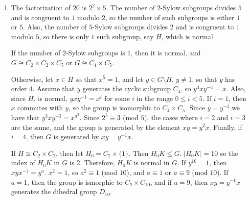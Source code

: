 \documentclass[a4paper,12pt]{article}
\begin{document}
\begin{enumerate}
\begin{enumerate}
            \item
                The factorization of $20$ is $2^2 \times 5$. The number of $2$-Sylow subgroups divides $5$ and is congruent to $1$ modulo $2$, so the number of such subgroups is either $1$ or $5$. Also, the number of $5$-Sylow subgroups divides $2$ and is congruent to $1$ modulo $5$, so there is only $1$ such subgroup, say $H$, which is normal. \par
                If the number of $2$-Sylow subgroups is $1$, then it is normal, and $G \cong C_2 \times C_2 \times C_5$ or $G \cong C_4 \times C_5$. \par
                Otherwise, let $x \in H$ so that $x^5 = 1$, and let $y \in G \setminus H$, $y \neq 1$, so that $y$ has order $4$. Assume that $y$ generates the cyclic subgroup $C_4$, so $y^4 xy^{-4} = x$. Also, since $H$, is normal, $yxy^{-1} = x^i$ for some $i$ in the range $0 \leq i < 5$. If $i = 1$, then $x$ commutes with $y$, so the group is isomorphic to $C_4 \times C_5$. Since $y = y^{-1}$ we have that $y^3 x y^{-3} = x^{a^3}$. Since $2^3 \equiv 3$ (mod $5$), the cases where $i = 2$ and $i = 3$ are the same, and the group is generated by the element $xy = y^2x$. Finally, if $i = 4$, then $G$ is generated by $xy = y^{-1}x$. \par
                If $H \cong C_2 \times C_2$, then let $H_0 = C_2 \times \{ 1 \}$. Then $H_0 K \leq G$. $|H_0 K| = 10$ so the index of $H_0 K$ in $G$ is 2. Therefore, $H_0 K$ is normal in $G$. If $y^{10} = 1$, then $xyx^{-1} = y^a$. $x^2 = 1$, so $a^2 \equiv 1$ (mod $10$), and $a \equiv 1$ or $a \equiv 9$ (mod $10$). If $a = 1$, then the group is ismorphic to $C_2 \times C_{10}$, and if $a = 9$, then $xy = y^{-1} x$ generates the dihedral group $D_{10}$.


\end{enumerate}
\end{enumerate}
\end{document}
